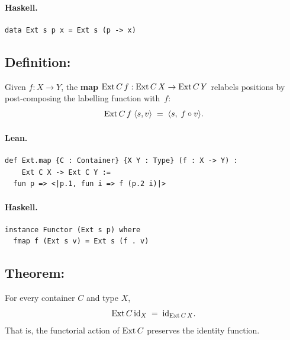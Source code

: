 \documentclass[11pt,a4paper]{article}
\begin{document}
\paragraph{Haskell.}
\begin{lstlisting}[style=haskell]
data Ext s p x = Ext s (p -> x)
\end{lstlisting}


\subsection{Definition: }

\begin{defn}
Given $f : X \to Y$, the \textbf{map} $\mathrm{Ext}\,C\,f : \mathrm{Ext}\,C\,X \to
\mathrm{Ext}\,C\,Y$ relabels positions by post-composing the labelling function
with~$f$:
\[
  \mathrm{Ext}\,C\,f\;\langle s, v \rangle \;=\; \langle s,\; f \circ v \rangle.
\]
\end{defn}

\paragraph{Lean.}
\begin{lstlisting}[style=lean]
def Ext.map {C : Container} {X Y : Type} (f : X -> Y) :
    Ext C X -> Ext C Y :=
  fun p => <|p.1, fun i => f (p.2 i)|>
\end{lstlisting}

\paragraph{Haskell.}
\begin{lstlisting}[style=haskell]
instance Functor (Ext s p) where
  fmap f (Ext s v) = Ext s (f . v)
\end{lstlisting}


\subsection{Theorem: }

\begin{thm}
For every container $C$ and type $X$,
\[
  \mathrm{Ext}\,C\,\mathrm{id}_X \;=\; \mathrm{id}_{\mathrm{Ext}\,C\,X}.
\]
That is, the functorial action of $\mathrm{Ext}\,C$ preserves the identity function.
\end{thm}
\end{document}
